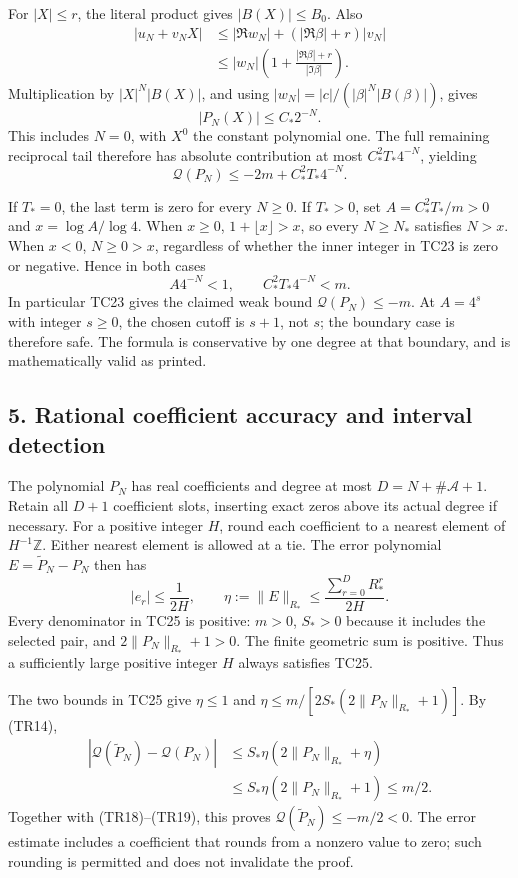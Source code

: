 For \(|X|\le r\), the literal product gives \(|B(X)|\le B_0\). Also \[
\begin{aligned}
|u_N+v_NX|
&\le |\Re w_N|+(|\Re\beta|+r)|v_N|\\
&\le |w_N|\left(1+\frac{|\Re\beta|+r}{|\Im\beta|}\right).
\end{aligned}
\tag{TR16}
\] Multiplication by \(|X|^N|B(X)|\), and using \(|w_N|=|c|/(|\beta|^N|B(\beta)|)\), gives \[
|P_N(X)|\le C_*2^{-N}.
\tag{TR17}
\] This includes \(N=0\), with \(X^0\) the constant polynomial one. The full remaining reciprocal tail therefore has absolute contribution at most \(C_*^2T_*4^{-N}\), yielding \[
\mathcal Q(P_N)\le-2m+C_*^2T_*4^{-N}.
\tag{TR18}
\]

If \(T_*=0\), the last term is zero for every \(N\ge0\). If \(T_*>0\), set \(A=C_*^2T_*/m>0\) and \(x=\log A/\log4\). When \(x\ge0\), \(1+\lfloor x\rfloor>x\), so every \(N\ge N_*\) satisfies \(N>x\). When \(x<0\), \(N\ge0>x\), regardless of whether the inner integer in TC23 is zero or negative. Hence in both cases \[
A4^{-N}<1,\qquad C_*^2T_*4^{-N}<m.
\tag{TR19}
\] In particular TC23 gives the claimed weak bound \(\mathcal Q(P_N)\le-m\). At \(A=4^s\) with integer \(s\ge0\), the chosen cutoff is \(s+1\), not \(s\); the boundary case is therefore safe. The formula is conservative by one degree at that boundary, and is mathematically valid as printed.

\subsection{5. Rational coefficient accuracy and interval detection}\label{rational-coefficient-accuracy-and-interval-detection}

The polynomial \(P_N\) has real coefficients and degree at most \(D=N+\#\mathcal A+1\). Retain all \(D+1\) coefficient slots, inserting exact zeros above its actual degree if necessary. For a positive integer \(H\), round each coefficient to a nearest element of \(H^{-1}\mathbb Z\). Either nearest element is allowed at a tie. The error polynomial \(E=\widetilde P_N-P_N\) then has \[
|e_r|\le\frac1{2H},\qquad
\eta:=\|E\|_{R_*}\le
\frac{\sum_{r=0}^{D}R_*^r}{2H}.
\tag{TR20}
\] Every denominator in TC25 is positive: \(m>0\), \(S_*>0\) because it includes the selected pair, and \(2\|P_N\|_{R_*}+1>0\). The finite geometric sum is positive. Thus a sufficiently large positive integer \(H\) always satisfies TC25.

The two bounds in TC25 give \(\eta\le1\) and \(\eta\le m/[2S_*(2\|P_N\|_{R_*}+1)]\). By (TR14), \[
\begin{aligned}
|\mathcal Q(\widetilde P_N)-\mathcal Q(P_N)|
&\le S_*\eta(2\|P_N\|_{R_*}+\eta)\\
&\le S_*\eta(2\|P_N\|_{R_*}+1)\le m/2.
\end{aligned}
\tag{TR21}
\] Together with (TR18)--(TR19), this proves \(\mathcal Q(\widetilde P_N)\le-m/2<0\). The error estimate includes a coefficient that rounds from a nonzero value to zero; such rounding is permitted and does not invalidate the proof.


